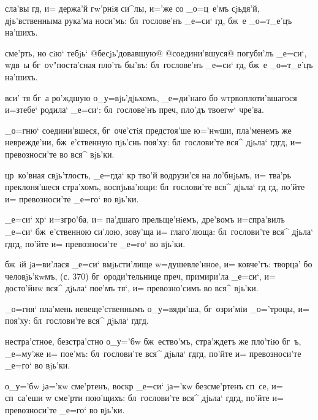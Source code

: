 {{

 сла'вы гд, и= держа'й гw'рнiя си^лы, 
и='же со _о=ц~е'мъ сjьдя'й, дjь'вственныма рука'ма 
носи'мь: бл~гослове'нъ _е=си` гд, бж~е _о=т_е'цъ 
на'шихъ.

 сме'рть, но сiю` тебjь` @бесjь'довавшую@ 
{@соедини'вшуся@} погуби'лъ _е=си`, w\т дв~ы 
бг~оv"поста'сная пло'ть бы'въ: бл~гослове'нъ _е=си` 
гд, бж~е _о=т_е'цъ на'шихъ.

 вси' тя бг~а ро'ждшую о_у=вjь'дjьхомъ, 
_е=ди'наго бо w\т тр воплоти'вшагося и=з\ъ тебе` 
родила` _е=си`: бл~гослове'нъ преч, пло'дъ твоегw` 
чре'ва.


  _о=гню` соедини'вшеся, 
бг~оче'стiя предстоя'ше ю='нwши, пла'менемъ же 
неврежде'ни, бж~е'ственную пjь'снь поя'ху: бл~гослови'те 
вся^ дjьла` гд гд, и= превозноси'те во вся^ 
вjь'ки.

 цр~ко'вная свjь'тлость, _е=гда` кр 
тво'й водрузи'ся на ло'бнjьмъ, и= тва'рь преклоня'шеся 
стра'хомъ, воспjьва'ющи: бл~гослови'те вся^ дjьла` гд 
гд, по'йте и= превозноси'те _е=го` во вjь'ки.

 _е=си` хр` и=з\ъ гро'ба, и= па'дшаго 
прельще'нiемъ, дре'вомъ и=спра'вилъ _е=си` бж~е'ственною 
си'лою, зову'ща и= глаго'люща: бл~гослови'те вся^ дjьла` 
гд гд, по'йте и= превозноси'те _е=го` во вjь'ки.

  бж~iй jа=ви'лася _е=си` 
вмjьсти'лище w=душевле'нное, и= ковче'гъ: творца' бо 
человjь'кwмъ, (с. 370) бг~ороди'тельнице преч, 
примири'ла _е=си`, и= досто'йнw вся^ дjьла` пое'мъ тя`, 
и= превозно'симъ во вся^ вjь'ки.


  _о=гня` пла'мень 
невеще'ственнымъ о_у=вяди'ша, бг~озри'мiи _о='троцы, и= 
поя'ху: бл~гослови'те вся^ дjьла` гд гд.

 нестра'стное, безстра'стно о_у='бw 
бж~ество'мъ, стра'ждетъ же пло'тiю бг~ъ, _е=му'же и= 
пое'мъ: бл~гослови'те вся^ дjьла` гд гд, по'йте и= 
превозноси'те _е=го` во вjь'ки.

 о_у='бw jа='кw сме'ртенъ, воскр 
_е=си` jа='кw безсме'ртенъ сп~се, и= сп~са'еши w\т 
сме'рти пою'щихъ: бл~гослови'те вся^ дjьла` гд гд, 
по'йте и= превозноси'те _е=го` во вjь'ки.

}}
